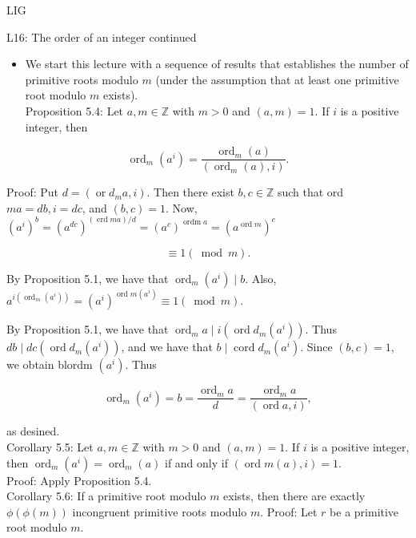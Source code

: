 \documentclass[10pt]{article}
\begin{document}
LIG

L16: The order of an integer continued

\begin{itemize}
  \item We start this lecture with a sequence of results that establishes the number of primitive roots modulo $m$ (under the assumption that at least one primitive root modulo $m$ exists).\\
Proposition 5.4: Let $a, m \in \mathbb{Z}$ with $m>0$ and $(a, m)=1$. If $i$ is a positive integer, then
\end{itemize}

$$
\operatorname{ord}_{m}\left(a^{i}\right)=\frac{\operatorname{ord}_{m}(a)}{\left(\operatorname{ord}_{m}(a), i\right)} .
$$

Proof: Put $d=\left(\operatorname{or} d_{m} a, i\right)$. Then there exist $b, c \in \mathbb{Z}$ such that ord $m a=d b, i=d c$, and $(b, c)=1$. Now,\\
$\left(a^{i}\right)^{b}=\left(a^{d c}\right)^{(\operatorname{erd} m a) / d}=\left(a^{c}\right)^{\operatorname{ordm} a}=\left(a^{\operatorname{ord} m}\right)^{c}$

$$
\equiv 1(\bmod m) .
$$

By Proposition 5.1, we have that $\operatorname{ord}_{m}\left(a^{i}\right) \mid b$. Also, $a^{i\left(\operatorname{ord}_{m}\left(a^{i}\right)\right)}=\left(a^{i}\right)^{\operatorname{ord} m\left(a^{i}\right)} \equiv 1(\bmod m)$.

By Proposition 5.1, we have that $\operatorname{ord}_{m} a \mid i\left(\operatorname{ord} d_{m}\left(a^{i}\right)\right)$. Thus $d b \mid d c\left(\operatorname{ord} d_{m}\left(a^{i}\right)\right)$, and we have that $b \mid \operatorname{cord} d_{m}\left(a^{i}\right)$. Since $(b, c)=1$, we obtain blordm $\left(a^{i}\right)$. Thus

$$
\operatorname{ord}_{m}\left(a^{i}\right)=b=\frac{\operatorname{ord}_{m} a}{d}=\frac{\operatorname{ord}_{m} a}{(\operatorname{ord} a, i)},
$$

as desined.\\
Corollary 5.5: Let $a, m \in \mathbb{Z}$ with $m>0$ and $(a, m)=1$. If $i$ is a positive integer, then $\operatorname{ord}_{m}\left(a^{i}\right)=\operatorname{ord}_{m}(a)$ if and only if $(\operatorname{ord} m(a), i)=1$.\\
Proof: Apply Proposition 5.4.\\
Corollary 5.6: If a primitive root modulo $m$ exists, then there are exactly $\phi(\phi(m))$ incongruent primitive roots modulo $m$. Proof: Let $r$ be a primitive root modulo $m$.
\end{document}
